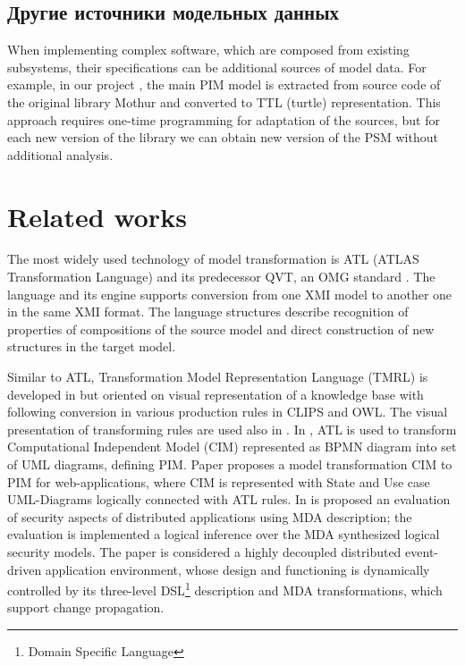 \documentclass[conference]{IEEEtran} \IEEEoverridecommandlockouts
\begin{document}
\subsection{Другие источники модельных данных} \label{sec:other-models} 

When implementing complex software, which are composed from existing subsystems, their specifications can be additional sources of model data. For example, in our project \cite{bit2019}, the main PIM model is extracted from source code of the original library Mothur and converted to TTL (turtle) representation. This approach requires one-time programming for adaptation of the sources, but for each new version of the library we can obtain new version of the PSM without additional analysis. 

\section{Related works} 

The most widely used technology of model transformation is ATL (ATLAS Transformation Language) \cite{atl} and its predecessor QVT, an OMG standard \cite{QVT}. The language and its engine supports conversion from one XMI model to another one in the same XMI format. The language structures describe recognition of properties of compositions of the source model and direct construction of new structures in the target model. 

Similar to ATL, Transformation Model Representation Language (TMRL) is developed in \cite{nikita} but oriented on visual representation of a knowledge base with following conversion in various production rules in CLIPS and OWL. The visual presentation of transforming rules are used also in \cite{GT}. In \cite{azis}, ATL is used to transform Computational Independent Model (CIM) represented as BPMN diagram into set of UML diagrams, defining PIM. Paper \cite{Rhazali} proposes a model transformation CIM to PIM for web-applications, where CIM is represented with State and Use case UML-Diagrams logically connected with ATL rules. In \cite{Hamid} is proposed an evaluation of security aspects of distributed applications using MDA description; the evaluation is implemented a logical inference over the MDA synthesized logical security models. The paper \cite{Zdun} is considered a highly decoupled distributed event-driven application environment, whose design and functioning is dynamically controlled by its three-level DSL\footnote{Domain Specific Language} description and MDA transformations, which support change propagation. 
\end{document}
